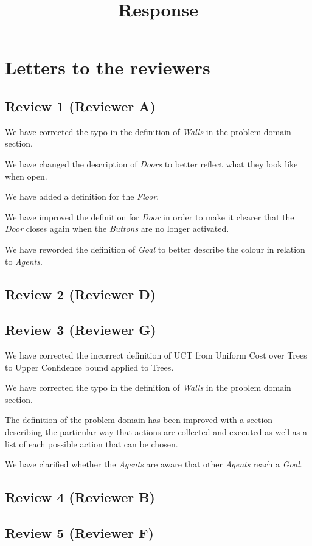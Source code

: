 \documentclass{article}
\title{Response}
\begin{document}
\maketitle
\section{Letters to the reviewers}
\subsection{Review 1 (Reviewer A)}
We have corrected the typo in the definition of \emph{Walls} in the problem domain section.

We have changed the description of \emph{Doors} to better reflect what they look like when open.

We have added a definition for the \emph{Floor}.

We have improved the definition for \emph{Door} in order to make it clearer that the \emph{Door} closes again when the \emph{Buttons} are no longer activated.

We have reworded the definition of \emph{Goal} to better describe the colour in relation to \emph{Agents}.
\subsection{Review 2 (Reviewer D)}
\subsection{Review 3 (Reviewer G)}
We have corrected the incorrect definition of UCT from Uniform Cost over Trees to Upper Confidence bound applied to Trees.

We have corrected the typo in the definition of \emph{Walls} in the problem domain section.

The definition of the problem domain has been improved with a section describing the particular way that actions are collected and executed as well as a list of each possible action that can be chosen.

We have clarified whether the \emph{Agents} are aware that other \emph{Agents} reach a \emph{Goal}.
\subsection{Review 4 (Reviewer B)}
\subsection{Review 5 (Reviewer F)}
\end{document}
